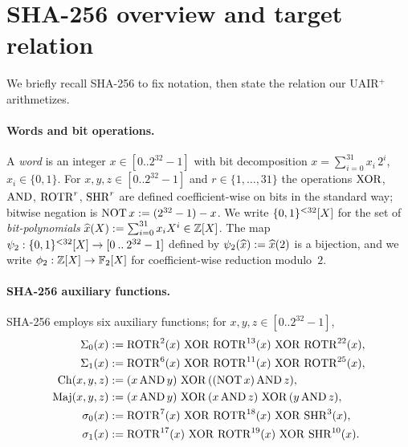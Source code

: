 \section{SHA-256 overview and target relation}\label{sec:overview}

We briefly recall SHA-256 to fix notation, then state the relation our
UAIR$^+$ arithmetizes.

\paragraph{Words and bit operations.}
A \emph{word} is an integer $x \in [0\mathbin{..}2^{32}-1]$ with bit
decomposition $x = \sum_{i=0}^{31} x_i\, 2^i$, $x_i \in \{0,1\}$.
For $x,y,z \in [0\mathbin{..}2^{32}-1]$ and $r \in \{1,\dots,31\}$ the
operations $\operatorname{XOR}$, $\operatorname{AND}$, $\operatorname{ROTR}^r$, $\operatorname{SHR}^r$ are defined coefficient-wise
on bits in the standard way; bitwise negation is
$\operatorname{NOT} x := (2^{32}-1) - x$. We write $\{0,1\}^{<32}[X]$ for the set of
\emph{bit-polynomials}
$\widehat{x}(X) := \sum_{i=0}^{31} x_i X^i \in \mathbb{Z}[X]$.
The map $\psi_{2}: \{0,1\}^{<32}[X] \to [0\mathbin{..}2^{32}-1]$ defined by
$\psi_{2}(\widehat{x}) := \widehat{x}(2)$ is a bijection, and we write
$\phi_{2}: \mathbb{Z}[X] \to \mathbb{F}_2[X]$ for coefficient-wise reduction modulo~$2$.

\paragraph{SHA-256 auxiliary functions.}
SHA-256 employs six auxiliary functions; for $x,y,z \in [0\mathbin{..}2^{32}-1]$,
\begin{align*}
\Sigma_0(x) &:= \operatorname{ROTR}^{2}(x)\, \operatorname{XOR}\, \operatorname{ROTR}^{13}(x)\, \operatorname{XOR}\, \operatorname{ROTR}^{22}(x), \\
\Sigma_1(x) &:= \operatorname{ROTR}^{6}(x)\, \operatorname{XOR}\, \operatorname{ROTR}^{11}(x)\, \operatorname{XOR}\, \operatorname{ROTR}^{25}(x), \\
\operatorname{Ch}(x,y,z) &:= (x \operatorname{AND} y)\, \operatorname{XOR}\, ((\operatorname{NOT} x) \operatorname{AND} z), \\
\operatorname{Maj}(x,y,z) &:= (x \operatorname{AND} y)\, \operatorname{XOR}\, (x \operatorname{AND} z)\, \operatorname{XOR}\, (y \operatorname{AND} z), \\
\sigma_0(x) &:= \operatorname{ROTR}^{7}(x)\, \operatorname{XOR}\, \operatorname{ROTR}^{18}(x)\, \operatorname{XOR}\, \operatorname{SHR}^{3}(x), \\
\sigma_1(x) &:= \operatorname{ROTR}^{17}(x)\, \operatorname{XOR}\, \operatorname{ROTR}^{19}(x)\, \operatorname{XOR}\, \operatorname{SHR}^{10}(x).
\end{align*}

